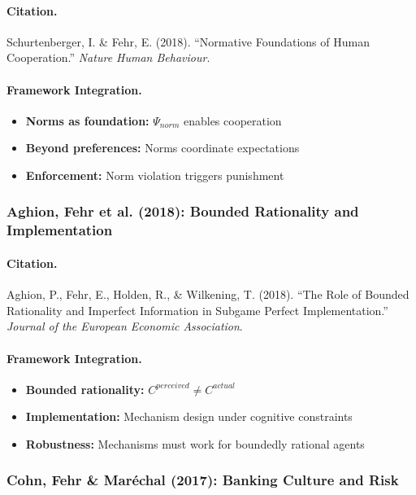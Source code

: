 \documentclass[12pt,a4paper]{article}
\begin{document}
\paragraph{Citation.}
Schurtenberger, I. \& Fehr, E. (2018).
``Normative Foundations of Human Cooperation.''
\emph{Nature Human Behaviour}.

\paragraph{Framework Integration.}
\begin{itemize}
  \item \textbf{Norms as foundation:} $\Psi_{norm}$ enables cooperation
  \item \textbf{Beyond preferences:} Norms coordinate expectations
  \item \textbf{Enforcement:} Norm violation triggers punishment
\end{itemize}

\subsubsection{Aghion, Fehr et al. (2018): Bounded Rationality and Implementation}

\paragraph{Citation.}
Aghion, P., Fehr, E., Holden, R., \& Wilkening, T. (2018).
``The Role of Bounded Rationality and Imperfect Information in Subgame Perfect Implementation.''
\emph{Journal of the European Economic Association}.

\paragraph{Framework Integration.}
\begin{itemize}
  \item \textbf{Bounded rationality:} $C^{perceived} \neq C^{actual}$
  \item \textbf{Implementation:} Mechanism design under cognitive constraints
  \item \textbf{Robustness:} Mechanisms must work for boundedly rational agents
\end{itemize}

\subsubsection{Cohn, Fehr \& Mar\'echal (2017): Banking Culture and Risk}
\end{document}
